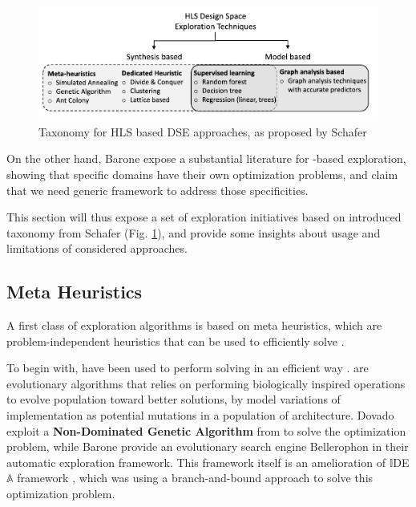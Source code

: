     \begin{figure}[h!]
        \centering
        \includegraphics[width=1.0\textwidth]{Figures/HLS-taxonomy}
        \caption[Taxonomy for HLS based DSE approaches]{Taxonomy for HLS based DSE approaches, as proposed by Schafer \etal{} \cite{schafer_high-level_2020}}
        \label{ch.state:sec.strategies:fig.taxonomy}
    \end{figure}

    On the other hand, Barone \etal{} \cite{barone_multi-objective_2021} expose a substantial literature for -based exploration, showing that specific domains have their own optimization problems, and claim that we need generic  framework to address those specificities.

    This section will thus expose a set of exploration initiatives based on introduced taxonomy from Schafer \etal{} \cite{schafer_high-level_2020} (Fig. \ref{ch.state:sec.strategies:fig.taxonomy}), and provide some insights about usage and limitations of considered approaches.

    \subsection{Meta Heuristics}
    \label{ch.state:sec.strategies:ssec.meta}
        A first class of exploration algorithms is based on meta heuristics, which are problem-independent heuristics that can be used to efficiently solve .

        To begin with,  have been used to perform  solving in an efficient way \cite{manuel_model-based_2020}.
         are evolutionary algorithms that relies on performing biologically inspired operations to evolve population toward better solutions, by model variations of implementation as potential mutations in a population of architecture.
        Dovado \cite{paletti_dovado_2021} exploit a {\bf Non-Dominated Genetic Algorithm} from \cite{shokri_algorithm_2013} to solve the  optimization problem, while Barone \etal{} \cite{barone_multi-objective_2021} provide an evolutionary search engine Bellerophon in their \eidea{} automatic exploration framework.
        This framework itself is an amelioration of $\mathbb{I}$DE$\mathbb{A}$ framework \cite{barbareschi_automatic_2016}, which was using a branch-and-bound approach to solve this optimization problem.

